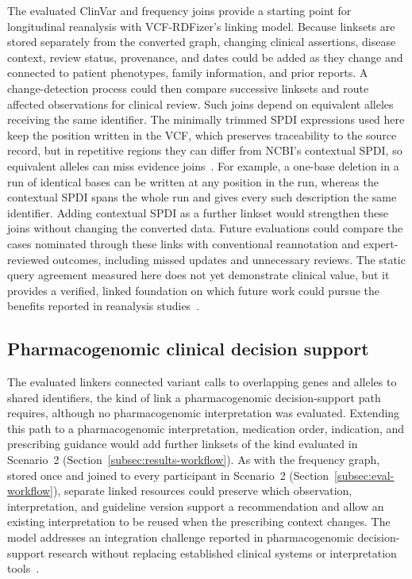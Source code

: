 \documentclass[pdflatex,sn-mathphys-num]{sn-jnl}
\begin{document}
The evaluated ClinVar and frequency joins provide a starting point for longitudinal reanalysis with VCF-RDFizer's linking model.
Because linksets are stored separately from the converted graph, changing clinical assertions, disease context, review status, provenance, and dates could be added as they change and connected to patient phenotypes, family information, and prior reports.
A change-detection process could then compare successive linksets and route affected observations for clinical review.
Such joins depend on equivalent alleles receiving the same identifier.
The minimally trimmed SPDI expressions used here keep the position written in the VCF, which preserves traceability to the source record, but in repetitive regions they can differ from NCBI's contextual SPDI, so equivalent alleles can miss evidence joins~\cite{holmes2020spdi}.
For example, a one-base deletion in a run of identical bases can be written at any position in the run, whereas the contextual SPDI spans the whole run and gives every such description the same identifier.
Adding contextual SPDI as a further linkset would strengthen these joins without changing the converted data.
Future evaluations could compare the cases nominated through these links with conventional reannotation and expert-reviewed outcomes, including missed updates and unnecessary reviews.
The static query agreement measured here does not yet demonstrate clinical value, but it provides a verified, linked foundation on which future work could pursue the benefits reported in reanalysis studies~\cite{hiatt2018systematic}.

\subsection{Pharmacogenomic clinical decision support}\label{subsec:disc-pgx}
The evaluated linkers connected variant calls to overlapping genes and alleles to shared identifiers, the kind of link a pharmacogenomic decision-support path requires, although no pharmacogenomic interpretation was evaluated.
Extending this path to a pharmacogenomic interpretation, medication order, indication, and prescribing guidance would add further linksets of the kind evaluated in Scenario~2 (Section~\ref{subsec:results-workflow}).
As with the frequency graph, stored once and joined to every participant in Scenario~2 (Section~\ref{subsec:eval-workflow}), separate linked resources could preserve which observation, interpretation, and guideline version support a recommendation and allow an existing interpretation to be reused when the prescribing context changes.
The model addresses an integration challenge reported in pharmacogenomic decision-support research without replacing established clinical systems or interpretation tools~\cite{wake2022pgx,johnson2024genetically}.
\end{document}
